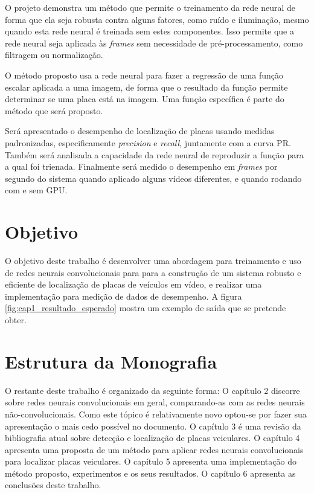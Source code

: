 O projeto demonstra um método que permite o treinamento da rede neural de forma
que ela seja robusta contra alguns fatores, como ruído e iluminação, mesmo
quando esta rede neural é treinada sem estes componentes. Isso permite que a
rede neural seja aplicada às \emph{frames} sem necessidade de
pré-processamento, como filtragem ou normalização.

O método proposto usa a rede neural para fazer a regressão de uma função
escalar aplicada a uma imagem, de forma que o resultado da função permite
determinar se uma placa está na imagem. Uma função específica é parte do método
que será proposto.

Será apresentado o desempenho de localização de placas usando medidas
padronizadas, especificamente \emph{precision} e \emph{recall}, juntamente com
a curva PR. Também será analisada a capacidade da rede neural de reproduzir a
função para a qual foi trienada. Finalmente será medido o desempenho em
\emph{frames} por segundo do sistema quando aplicado alguns vídeos diferentes,
e quando rodando com e sem GPU.

\section{Objetivo}
O objetivo deste trabalho é desenvolver uma abordagem para
treinamento e uso de redes neurais convolucionais para para a
construção de um sistema robusto e eficiente de localização de
placas de veículos em vídeo, e realizar uma implementação para
medição de dados de desempenho. A figura \ref{fig:cap1_resultado_esperado}
mostra um exemplo de saída que se pretende obter.

\section{Estrutura da Monografia}
O restante deste trabalho é organizado da seguinte forma: O
capítulo 2 discorre sobre redes neurais convolucionais em geral,
comparando-as com as redes neurais não-convolucionais. Como este
tópico é relativamente novo optou-se por fazer sua apresentação
o mais cedo possível no documento. O capítulo 3 é uma revisão da
bibliografia atual sobre detecção e localização de placas veiculares. O
capítulo 4 apresenta uma proposta de um método para aplicar redes neurais
convolucionais para localizar placas veiculares. O capítulo 5 apresenta uma
implementação do método proposto, experimentos e os seus resultados. O
capítulo 6 apresenta as conclusões deste trabalho.

